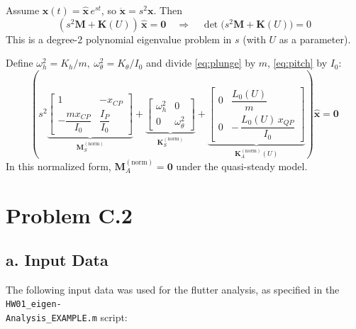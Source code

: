 \documentclass{article}
\begin{document}
\noindent Assume \(\bm{x}(t)=\hat{\bm{x}}\,e^{st}\), so \(\ddot{\bm{x}}=s^2\bm{x}\).
Then
\begin{equation}
(s^2\mathbf{M}+\mathbf{K}(U))\,\hat{\bm{x}}=\bm{0} \quad\Longrightarrow\quad
\det\!\big(s^2\mathbf{M}+\mathbf{K}(U)\big)=0
\label{eq:eigenvalue_determinant}
\end{equation}
\noindent This is a degree-2 polynomial eigenvalue problem in \(s\) (with \(U\) as a parameter).


\noindent Define \(\omega_h^2=K_h/m,\ \omega_\theta^2=K_\theta/I_0\) and divide \eqref{eq:plunge} by \(m\), \eqref{eq:pitch} by \(I_0\):
\begin{equation}
\left(
s^2
\underbrace{\begin{bmatrix}
1 & -x_{CP}\\[2pt]
-\dfrac{m x_{CP}}{I_0} & \dfrac{I_P}{I_0}
\end{bmatrix}}_{\displaystyle \mathbf{M}_S^{(\mathrm{norm})}}
+
\underbrace{\begin{bmatrix}
\omega_h^2 & 0\\[2pt]
0 & \omega_\theta^2
\end{bmatrix}}_{\displaystyle \mathbf{K}_S^{(\mathrm{norm})}}
+
\underbrace{\begin{bmatrix}
0 & \dfrac{L_0(U)}{m}\\[8pt]
0 & -\,\dfrac{L_0(U)\,x_{QP}}{I_0}
\end{bmatrix}}_{\displaystyle \mathbf{K}_A^{(\mathrm{norm})}(U)}
\right)\hat{\bm{x}}=\bm{0}
\label{eq:normalized_system}
\end{equation}
\noindent In this normalized form, \(\mathbf{M}_A^{(\mathrm{norm})}=\mathbf{0}\) under the quasi-steady model.


\newpage
\section{Problem C.2}

\subsection{a. Input Data}
The following input data was used for the flutter analysis, as specified in the \texttt{HW01\_eigen-\\Analysis\_EXAMPLE.m} script:
\end{document}
